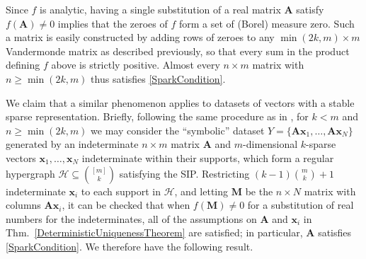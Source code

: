 \documentclass[journal, twocolumn]{IEEEtran}
\begin{document}
Since $f$ is analytic, having a single substitution of a real matrix $\mathbf{A}$ satisfy $f(\mathbf{A}) \neq 0$ implies that the zeroes of $f$ form a set of (Borel) measure zero. Such a matrix is easily constructed by adding rows of zeroes to any $\min(2k,m) \times m$ Vandermonde matrix as described previously, so that every sum in the product defining $f$ above is strictly positive. Almost every $n \times m$ matrix with $n \geq \min(2k,m)$ thus satisfies \eqref{SparkCondition}.

%


We claim that a similar phenomenon applies to datasets of vectors with a stable sparse representation. Briefly, following the same procedure as in \cite[Sec.~IV]{Hillar15}, for $k < m$ and $n \geq \min(2k, m)$ we may consider the ``symbolic'' dataset $Y = \{\mathbf{A}\mathbf{x}_1,\ldots,\mathbf{A} \mathbf{x}_N\}$ generated by an indeterminate $n \times m$ matrix $\mathbf{A}$ and $m$-dimensional $k$-sparse vectors $\mathbf{x}_1, \ldots, \mathbf{x}_N$ indeterminate within their supports, which form a regular hypergraph $\mathcal{H} \subseteq {[m] \choose k}$ satisfying the SIP. Restricting \mbox{$(k-1){m \choose k} + 1$} indeterminate $\mathbf{x}_i$ to each support in $\mathcal{H}$, and letting $\textbf{M}$ be the $n \times N$ matrix with columns $\mathbf{A}\mathbf{x}_i$, it can be checked that when $f(\mathbf{M}) \neq 0$ for a substitution of real numbers for the indeterminates, all of the assumptions on $\mathbf{A}$ and $\mathbf{x}_i$ in Thm.~\ref{DeterministicUniquenessTheorem} are satisfied; in particular, $\mathbf{A}$ satisfies \eqref{SparkCondition}. We therefore have the following result.
\end{document}
